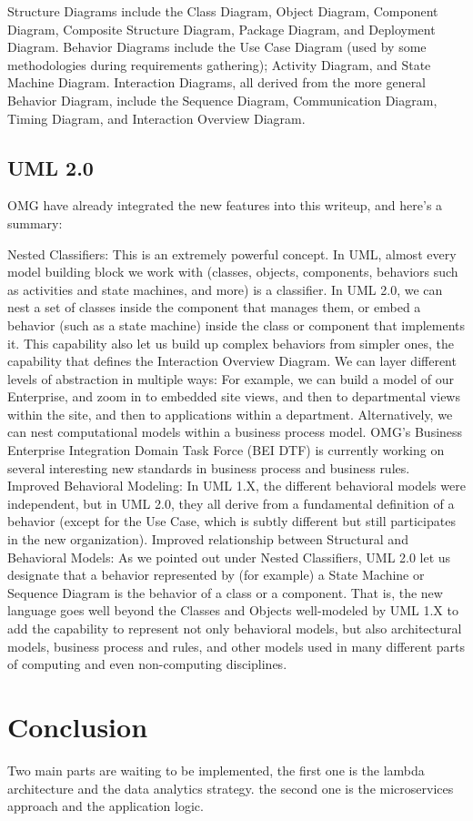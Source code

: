 Structure Diagrams include the Class Diagram, Object Diagram, Component Diagram, Composite Structure Diagram, Package Diagram, and Deployment Diagram. 
Behavior Diagrams include the Use Case Diagram (used by some methodologies during requirements gathering); Activity Diagram, and State Machine Diagram. 
Interaction Diagrams, all derived from the more general Behavior Diagram, include the Sequence Diagram, Communication Diagram, Timing Diagram, and 
Interaction Overview Diagram.

\subsection{UML 2.0}
\label{subsec:subsec01}
OMG have already integrated the new features into this writeup, and here's a summary: 

Nested Classifiers: This is an extremely powerful concept. In UML, almost every model building block we work with (classes, objects, components, 
behaviors such as activities and state machines, and more) is a classifier. In UML 2.0, we can nest a set of classes inside the component that manages 
them, or embed a behavior (such as a state machine) inside the class or component that implements it. This capability also let us build up complex behaviors 
from simpler ones, the capability that defines the Interaction Overview Diagram. We can layer different levels of abstraction in multiple ways: 
For example, we can build a model of our Enterprise, and zoom in to embedded site views, and then to departmental views within the site, 
and then to applications within a department. Alternatively, we can nest computational models within a business process model. 
OMG's Business Enterprise Integration Domain Task Force (BEI DTF) is currently working on several interesting new standards in business process 
and business rules. 
Improved Behavioral Modeling: In UML 1.X, the different behavioral models were independent, but in UML 2.0, they all derive from a fundamental 
definition of a behavior (except for the Use Case, which is subtly different but still participates in the new organization). 
Improved relationship between Structural and Behavioral Models: As we pointed out under Nested Classifiers, UML 2.0 let us designate that a behavior 
represented by (for example) a State Machine or Sequence Diagram is the behavior of a class or a component. 
That is, the new language goes well beyond the Classes and Objects well-modeled by UML 1.X to add the capability to represent not 
only behavioral models, but also architectural models, business process and rules, and other models used in many different parts of computing and
 even non-computing disciplines. 

\section{ Conclusion }
\label{subsec:subsec01}
Two main parts are waiting to be implemented, the first one is the lambda architecture and the data analytics strategy. the second one is the microservices approach and the application logic.

